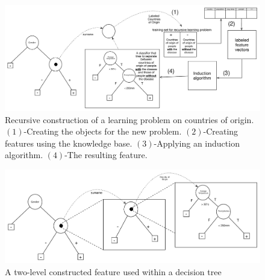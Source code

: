 \documentclass[twoside,11pt]{article}
\theoremstyle{definition}
\begin{document}
\begin{figure}[t]
	\centering
	\includegraphics[width=\linewidth]{fig4_annotated.pdf}
	\caption{Recursive construction of a learning problem on countries of origin. $(1)$-Creating the objects for the new problem. $(2)$-Creating features using the knowledge base. $(3)$-Applying an induction algorithm. $(4)$-The resulting feature.}
	\label{fig:moving_to_lvl2}
\end{figure}

\begin{figure}[t]
	\centering
	\includegraphics[width=\linewidth]{fig3.pdf}
	\caption{A two-level constructed feature used within a decision tree}
	\label{fig:lvl2_tree}
\end{figure}



\end{document}

